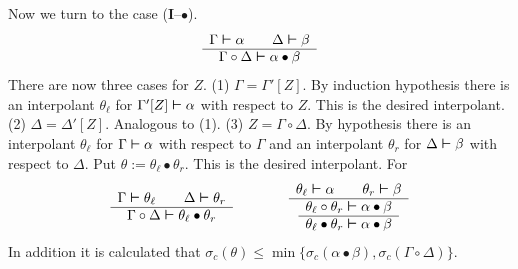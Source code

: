 Now we turn to the case (\textbf{I}--$\bullet$).
\begin{equation}
\begin{array}{c}
\Gamma \boldsymbol{\vdash} \alpha \qquad \Delta \boldsymbol{\vdash} \beta \\\hline
\Gamma \circ \Delta \boldsymbol{\vdash} \alpha \bullet \beta
\end{array}
\end{equation}
There are now three cases for $Z$. (1) $\Gamma = \Gamma'[Z]$.
By  induction hypothesis there is an interpolant $\theta_{\ell}$
for $\Gamma'[Z] \boldsymbol{\vdash} \alpha$ with respect to $Z$. This is the
desired interpolant. (2) $\Delta = \Delta'[Z]$. Analogous to (1).
(3) $Z = \Gamma \circ \Delta$. By hypothesis there is an interpolant
$\theta_{\ell}$ for $\Gamma \boldsymbol{\vdash} \alpha$ with respect to
$\Gamma$ and an interpolant $\theta_r$ for $\Delta
\boldsymbol{\vdash} \beta$ with respect to $\Delta$. Put $\theta :=
\theta_{\ell} \bullet \theta_r$. This is the desired
interpolant. For
\begin{equation}
\begin{array}{c}
\Gamma \boldsymbol{\vdash} \theta_{\ell} \qquad \Delta \boldsymbol{\vdash} \theta_r \\\hline
\Gamma \circ \Delta \boldsymbol{\vdash} \theta_{\ell} \bullet \theta_r
\end{array}
\qquad \qquad
\begin{array}{c}
\theta_{\ell} \boldsymbol{\vdash} \alpha \qquad \theta_r \boldsymbol{\vdash} \beta \\\hline
\begin{array}{c}
\theta_{\ell} \circ \theta_r \boldsymbol{\vdash} \alpha \bullet \beta \\\hline
\theta_{\ell} \bullet \theta_r \boldsymbol{\vdash} \alpha \bullet \beta
\end{array}
\end{array}
\end{equation}
In addition it is calculated that
$\sigma_c(\theta) \leq \min\{\sigma_c(\alpha \bullet
\beta), \sigma_c(\Gamma \circ \Delta)\}$.

